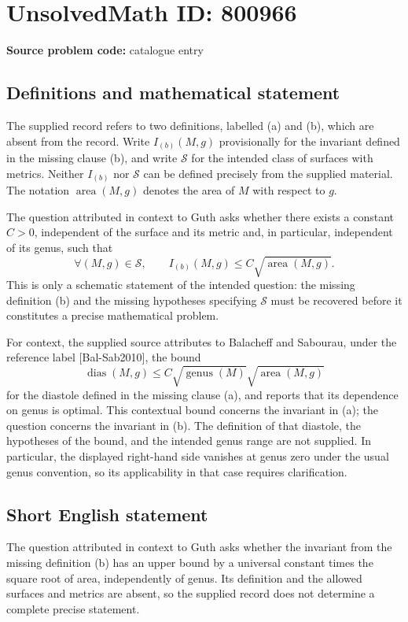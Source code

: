 \documentclass[11pt]{article}
\begin{document}
\section*{UnsolvedMath ID: 800966}
\textbf{Source problem code:} catalogue entry
\subsection{Definitions and mathematical statement}
The supplied record refers to two definitions, labelled (a) and (b), which are absent from the record. Write \(I_{(b)}(M,g)\) provisionally for the invariant defined in the missing clause (b), and write \(\mathcal S\) for the intended class of surfaces with metrics. Neither \(I_{(b)}\) nor \(\mathcal S\) can be defined precisely from the supplied material. The notation \(\operatorname{area}(M,g)\) denotes the area of \(M\) with respect to \(g\).

The question attributed in context to Guth asks whether there exists a constant \(C>0\), independent of the surface and its metric and, in particular, independent of its genus, such that
\[
\forall (M,g)\in\mathcal S,\qquad I_{(b)}(M,g)\leq C\sqrt{\operatorname{area}(M,g)}.
\]
This is only a schematic statement of the intended question: the missing definition (b) and the missing hypotheses specifying \(\mathcal S\) must be recovered before it constitutes a precise mathematical problem.

For context, the supplied source attributes to Balacheff and Sabourau, under the reference label [Bal-Sab2010], the bound
\[
\operatorname{dias}(M,g)\leq C\sqrt{\operatorname{genus}(M)}\sqrt{\operatorname{area}(M,g)}
\]
for the diastole defined in the missing clause (a), and reports that its dependence on genus is optimal. This contextual bound concerns the invariant in (a); the question concerns the invariant in (b). The definition of that diastole, the hypotheses of the bound, and the intended genus range are not supplied. In particular, the displayed right-hand side vanishes at genus zero under the usual genus convention, so its applicability in that case requires clarification.
\subsection{Short English statement}
The question attributed in context to Guth asks whether the invariant from the missing definition (b) has an upper bound by a universal constant times the square root of area, independently of genus. Its definition and the allowed surfaces and metrics are absent, so the supplied record does not determine a complete precise statement.
\end{document}
